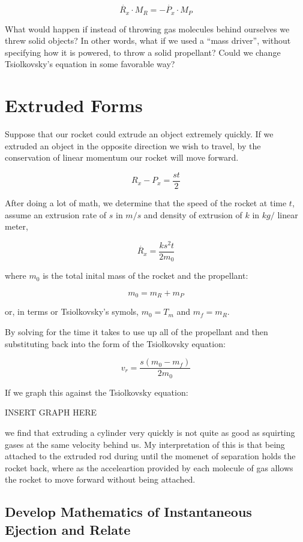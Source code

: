 \documentclass[11pt]{article}
\begin{document}
\[
\label{conslinmom} \tag{CLM} \dot{R_x}\cdot M_R = - \dot{P_x} \cdot M_P
\]

What would happen if instead of throwing gas molecules behind ourselves
we threw solid objects? In other words, what if we used a ``mass driver'',
without specifying how it is powered, to throw a solid propellant?
Could we change Tsiolkovsky's equation in some favorable way?

\section{Extruded Forms}

Suppose that our rocket could extrude an object extremely quickly.
If we extruded an object in the opposite direction we wish to travel,
by the conservation of linear momentum our rocket will move forward.

\[
\tag{Linear Extrusion} R_x - P_x  = \frac{s t}{2}
\]


After doing a lot of math, we determine that the speed of the rocket
at time $t$, assume an extrusion rate of $s$ in $m /s$ and density
of extrusion of $k$ in $kg / $ linear meter, 

\[
\dot{R_x} = \frac{k s^2 t}{2 m_0}
\]

where $m_0$ is the total inital mass of the rocket and the propellant:

\[
m_0 = m_R + m_P
\]

or, in terms or Tsiolkovsky's symols, $m_0 = T_m$ and $m_f = m_R$.

By solving for the time it takes to use up all of the propellant and
then substituting back into the form of the Tsiolkovsky equation:

\[
v_r = \frac{s (m_0-m_f)}{2 m_0}
\]

If we graph this against the Tsiolkovsky equation:

INSERT GRAPH HERE

we find that extruding a cylinder very quickly is not quite as
good as squirting gases at the same velocity behind us.
My interpretation of this is that being attached to the extruded
rod during until the momenet of separation holds the rocket back,
where as the acceleartion provided by each molecule of gas
allows the rocket to move forward without being attached.

\subsection{Develop Mathematics of Instantaneous Ejection and Relate}
\end{document}
